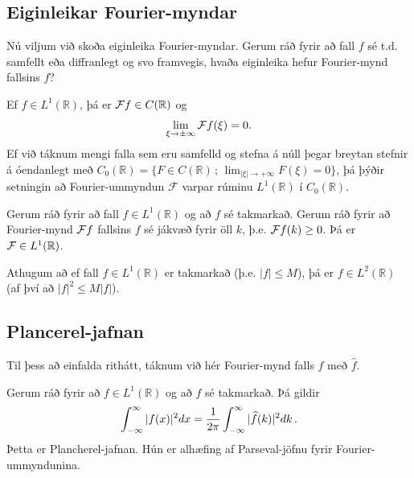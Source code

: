 \documentclass[a4paper,10pt,icelandic]{sphinxmanual}
\begin{document}
\subsection{Eiginleikar Fourier-myndar}
\label{\detokenize{Kafli04:eiginleikar-fourier-myndar}}
Nú viljum við skoða eiginleika Fourier-myndar. Gerum ráð fyrir að fall \(f\) sé t.d. samfellt eða diffranlegt og svo framvegis, hvaða eiginleika hefur Fourier-mynd fallsins \(f\)?


Ef \(f\in L^1({{\mathbb R}})\), þá er \({{\cal F}}f\in C({{\mathbb R}})\) og
\begin{equation*}
\begin{split}\lim_{\xi\to \pm \infty}{{\cal F}}f(\xi)=0.\end{split}
\end{equation*}
Ef við táknum mengi falla sem eru samfelld og stefna á núll þegar breytan stefnir á óendanlegt með \(C_0({{\mathbb R}})=\{F\in C({{\mathbb R}})\,;\, \lim_{|\xi|\to +\infty}F(\xi)=0\}\), þá þýðir setningin að Fourier-ummyndun \(\mathcal F\) varpar rúminu \(L^1(\mathbb R)\) í \(C_0(\mathbb R)\).


Gerum ráð fyrir að fall \(f\in L^1(\mathbb R)\) og að \(f\) sé takmarkað. Gerum ráð fyrir að Fourier-mynd \({{\cal F}}f\) fallsins \(f\) sé jákvæð fyrir öll \(k\), þ.e. \({{\cal F}}f(k)\ge 0\). Þá er \({{\cal F}}\in L^1(\mathbb R)\).

Athugum að ef fall \(f\in L^1(\mathbb R)\) er takmarkað (þ.e. \(|f|\le M\)), þá er \(f\in L^2(\mathbb R)\) (af því að \(|f|^2\le M|f|\)).


\subsection{Plancerel-jafnan}
\label{\detokenize{Kafli04:plancerel-jafnan}}
Til þess að einfalda rithátt, táknum við hér Fourier-mynd falls \(f\) með \(\widehat f\).

Gerum ráð fyrir að \(f\in L^1(\mathbb R)\) og að \(f\) sé takmarkað.
Þá gildir
\begin{equation*}
\begin{split}\int_{-\infty}^\infty |f(x)|^2 dx= {1\over 2\pi} \int_{-\infty}^\infty |\widehat{f}(k)|^2 dk\,.\end{split}
\end{equation*}
Þetta er Plancherel-jafnan. Hún er alhæfing af Parseval-jöfnu fyrir Fourier-ummyndunina.
\end{document}
